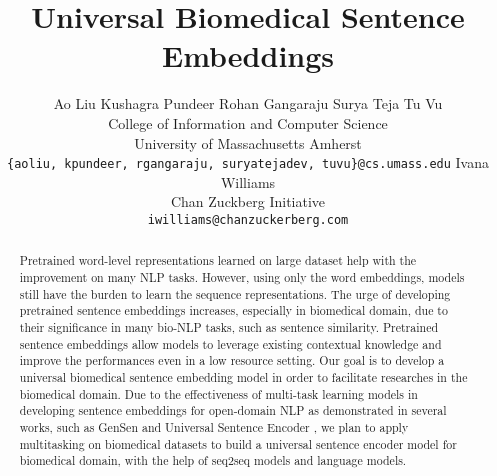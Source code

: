 \documentclass[11pt,a4paper]{article}
\begin{document}
\title{Universal Biomedical Sentence Embeddings}

\author{Ao Liu \qquad Kushagra Pundeer \qquad Rohan Gangaraju \qquad Surya Teja \qquad Tu Vu\\
  College of Information and Computer Science\\
  University of Massachusetts Amherst\\
  {\tt \{aoliu, kpundeer, rgangaraju, suryatejadev, tuvu\}@cs.umass.edu}
  \AND
  Ivana Williams\\
  Chan Zuckberg Initiative\\
  {\tt iwilliams@chanzuckerberg.com}}

\date{}


\maketitle


\begin{abstract}
  Pretrained word-level representations learned on large dataset help with the improvement on many NLP tasks. However, using only the word embeddings, models still have the burden to learn the sequence representations. The urge of developing pretrained sentence embeddings increases, especially in biomedical domain, due to their significance in many bio-NLP tasks, such as sentence similarity. Pretrained sentence embeddings allow models to leverage existing contextual knowledge and improve the performances even in a low resource setting. Our goal is to develop a universal biomedical sentence embedding model in order to facilitate researches in the biomedical domain. Due to the effectiveness of multi-task learning models in developing sentence embeddings for open-domain NLP as demonstrated in several works, such as GenSen \citep{subramanian2018learning} and Universal Sentence Encoder \citep{cer2018universal}, we plan to apply multitasking on biomedical datasets to build a universal sentence encoder model for biomedical domain, with the help of seq2seq models and language models.
\end{abstract}
\end{document}
